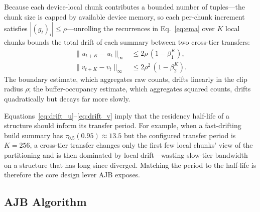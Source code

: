 \documentclass{article}
\begin{document}
Because each device-local chunk contributes a bounded number of tuples---the
chunk size is capped by available device memory, so each per-chunk increment
satisfies $|(g_t)_i| \leq \rho$---unrolling the recurrences in
Eq.~\eqref{eq:ema} over $K$ local chunks bounds the total drift of each summary
between two cross-tier transfers:
\begin{align}
\|u_{t+K} - u_t\|_\infty &\leq 2\rho\,(1 - \beta_1^{K}),
\label{eq:drift_u}\\
\|v_{t+K} - v_t\|_\infty &\leq 2\rho^2\,(1 - \beta_2^{K}).
\label{eq:drift_v}
\end{align}
The boundary estimate, which aggregates raw counts, drifts linearly in the
clip radius $\rho$; the buffer-occupancy estimate, which aggregates squared
counts, drifts quadratically but decays far more slowly.

Equations~\eqref{eq:drift_u}--\eqref{eq:drift_v} imply that the residency
half-life of a structure should inform its transfer period. For example, when a
fast-drifting build summary has $\tau_{0.5}(0.95) \approx 13.5$ but the
configured transfer period is $K = 256$, a cross-tier transfer changes only the
first few local chunks' view of the partitioning and is then dominated by
local drift---wasting slow-tier bandwidth on a structure that has long since
diverged. Matching the period to the half-life is therefore the core
design lever AJB exposes.

\subsection{AJB Algorithm}
\label{sec:ajb_algorithm}
\end{document}
